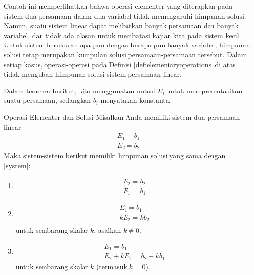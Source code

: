 Contoh ini memperlihatkan bahwa operasi elementer yang diterapkan pada sistem dua persamaan dalam dua variabel
tidak memengaruhi himpunan solusi. Namun, suatu sistem linear dapat melibatkan banyak persamaan dan banyak variabel, dan tidak ada
alasan untuk membatasi kajian kita pada sistem kecil. Untuk sistem berukuran apa pun dengan berapa pun banyak variabel,
himpunan solusi tetap merupakan kumpulan solusi persamaan-persamaan tersebut. Dalam setiap
kasus, operasi-operasi pada Definisi \ref{def:elementaryoperations} di atas tidak
mengubah himpunan solusi sistem persamaan linear.

Dalam teorema berikut, kita menggunakan notasi $E_i$ untuk merepresentasikan suatu persamaan, sedangkan $b_i$ menyatakan
konstanta.

\begin{theorem}{Operasi Elementer dan Solusi}\label{thm:elementaryoperationsandsolns}
Misalkan Anda memiliki sistem dua persamaan linear
\begin{equation}
 \begin{array}{c}
  E_{1}=b_{1}\\
  E_{2}=b_{2}
\end{array} \label{system}
\end{equation}
Maka sistem-sistem berikut memiliki himpunan solusi yang sama dengan \ref{system}:
\begin{enumerate}
\item   \begin{equation}
	\begin{array}{c}
	E_{2}=b_{2}\\
	E_{1}=b_{1}
	\end{array}
	\label{thm1.9.1}
	\end{equation}
\item  \begin{equation}
	\begin{array}{c}
	E_{1}=b_{1} \\
	kE_{2}=kb_{2}\\        
	\end{array}
	\label{thm1.9.2}
	\end{equation}
  untuk sembarang skalar $k$, asalkan $k\neq0$.
\item \begin{equation}
      \begin{array}{c}
       E_{1}=b_{1} \\
       E_{2}+kE_{1}=b_{2}+kb_{1}
       \end{array}  
	\label{thm1.9.3}
	\end{equation}
	untuk sembarang skalar $k$ (termasuk $k=0$).

\end{enumerate}
\end{theorem}

